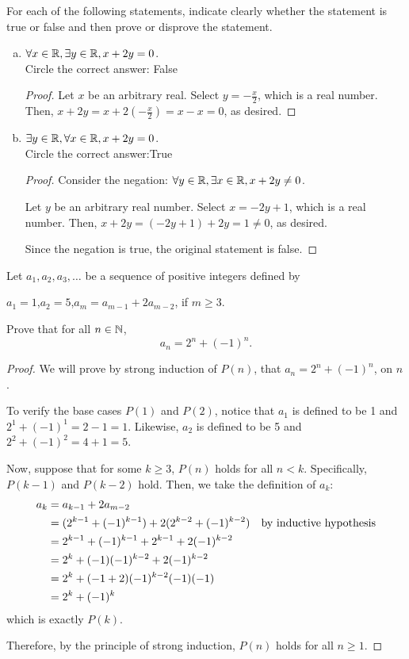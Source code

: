 \question For each of the following statements,
indicate clearly whether the statement is true or false and then prove or disprove the statement.
\begin{enumerate}[(a)]
  \item $\forall x\in\mathbb{R}, \exists y\in\mathbb{R}, x+2y=0$. \\
        Circle the correct answer:\quad {} \quad False
        \begin{proof}
          Let $x$ be an arbitrary real.
          Select $y = -\frac{x}{2}$, which is a real number.
          Then, $x+2y = x+2(-\frac{x}{2}) = x-x = 0$, as desired.
        \end{proof}
  \item $\exists y\in\mathbb{R}, \forall x\in\mathbb{R}, x+2y=0$. \\
        Circle the correct answer:\quad True \quad {}
        \begin{proof}
          Consider the negation: $\forall y\in\mathbb{R}, \exists x\in\mathbb{R}, x+2y \neq 0$.

          Let $y$ be an arbitrary real number.
          Select $x = -2y+1$, which is a real number.
          Then, $x+2y = (-2y+1)+2y = 1 \neq 0$, as desired.

          Since the negation is true, the original statement is false.
        \end{proof}
\end{enumerate}


\question Let $a_1,a_2,a_3,\dots$ be a sequence of positive integers defined by
\begin{center}
  $a_1=1$,\quad $a_2=5$,\quad $a_m=a_{m-1}+2a_{m-2}$, if $m \geq 3$.
\end{center}
Prove that for all $n\in\mathbb{N}$, \[ a_n = 2^n + (-1)^n. \]
\begin{proof}
  We will prove by strong induction of $P(n)$, that $a_n=2^n+(-1)^n$, on $n$.

  To verify the base cases $P(1)$ and $P(2)$,
  notice that $a_1$ is defined to be 1 and $2^1+(-1)^1=2-1=1$.
  Likewise, $a_2$ is defined to be 5 and $2^2+(-1)^2=4+1=5$.

  Now, suppose that for some $k \geq 3$, $P(n)$ holds for all $n < k$.
  Specifically, $P(k-1)$ and $P(k-2)$ hold.
  Then, we take the definition of $a_k$:
  \begin{align*}
    a_k & = a_{k-1} + 2a_{m-2}                                 \\
        & = (2^{k-1}+(-1)^{k-1}) + 2(2^{k-2} + (-1)^{k-2}) & \text{by inductive hypothesis} \\
        & = 2^{k-1}+(-1)^{k-1} + 2^{k-1} + 2(-1)^{k-2}         \\
        & = 2^k + (-1)(-1)^{k-2}+ 2(-1)^{k-2}                  \\
        & = 2^k + (-1+2)(-1)^{k-2}(-1)(-1)                     \\
        & = 2^k + (-1)^{k}
  \end{align*}
  which is exactly $P(k)$.

  Therefore, by the principle of strong induction, $P(n)$ holds for all $n \geq 1$.
\end{proof}


